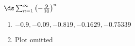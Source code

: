 {$\ds \sum_{n=1}^\infty \left(-\frac{9}{10}\right)^n$
}
{\begin{enumerate}
\item	$-0.9,-0.09,-0.819,-0.1629,-0.75339$
\item	Plot omitted
\end{enumerate}
}
